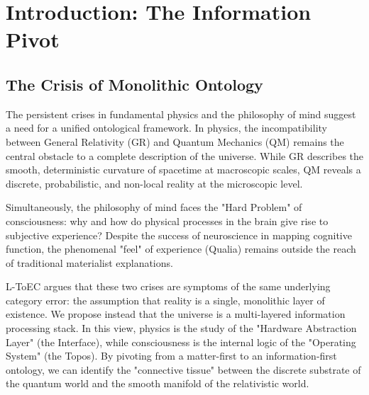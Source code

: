 \documentclass[11pt,titlepage]{article}
\begin{document}
\section{Introduction: The Information Pivot}

\subsection{The Crisis of Monolithic Ontology}
The persistent crises in fundamental physics and the philosophy of mind suggest a need for a unified ontological framework. In physics, the incompatibility between General Relativity (GR) and Quantum Mechanics (QM) remains the central obstacle to a complete description of the universe. While GR describes the smooth, deterministic curvature of spacetime at macroscopic scales, QM reveals a discrete, probabilistic, and non-local reality at the microscopic level.

Simultaneously, the philosophy of mind faces the "Hard Problem" of consciousness: why and how do physical processes in the brain give rise to subjective experience? Despite the success of neuroscience in mapping cognitive function, the phenomenal "feel" of experience (Qualia) remains outside the reach of traditional materialist explanations.

L-ToEC argues that these two crises are symptoms of the same underlying category error: the assumption that reality is a single, monolithic layer of existence. We propose instead that the universe is a multi-layered information processing stack. In this view, physics is the study of the "Hardware Abstraction Layer" (the Interface), while consciousness is the internal logic of the "Operating System" (the Topos). By pivoting from a matter-first to an information-first ontology, we can identify the "connective tissue" between the discrete substrate of the quantum world and the smooth manifold of the relativistic world.
\end{document}
